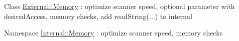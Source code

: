 
\begin{DoxyRefList}
\item[Class \mbox{\hyperlink{class_external_1_1_memory}{External::Memory}} ]\label{todo__todo000001}%
%
\+: optimize scanner speed, optional parameter with desired\+Access, memory checks, add read\+String(...) to internal  
\item[Namespace \mbox{\hyperlink{namespace_internal_1_1_memory}{Internal::Memory}} ]\label{todo__todo000002}%
%
\+: optimize scanner speed, memory checks 
\end{DoxyRefList}